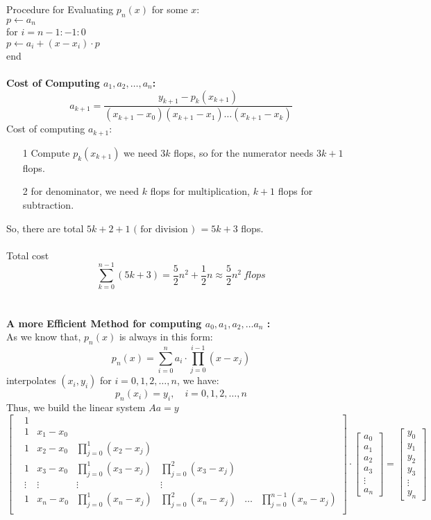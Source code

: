 \documentclass [9 pt]{article}
\theoremstyle{definition}
\begin{document}
Procedure for Evaluating $p_n(x)$ for some $x$:\\
$p \gets a_n$\\
for $i = n - 1 : -1 : 0$\\
$p \gets a_i + (x - x_i) \cdot p$\\
end\\
\\
\textbf{Cost of Computing $a_1, a_2, \ldots , a_n$:}
$$ a_{k+1} = \dfrac{y_{k+1} - p_{k}(x_{k+1})}{ (x_{k+1} - x_0)(x_{k+1} - x_1) \ldots (x_{k+1} - x_k) } $$
Cost of computing $a_{k+1}$:
\begin{itemize}
	\item[1] Compute $p_{k}(x_{k+1})$ we need $3k$ flops, so for the numerator needs $3k+1$ flops.
	\item[2] for denominator, we need $k$ flops for multiplication, $k+1$ flops for subtraction.  
\end{itemize}
So, there are total $5k+2 + 1  \text{ ( for division ) } = 5k+3$ flops.\\
\\
Total cost 
$$ \sum_{k = 0}^{n - 1} (5k + 3) = \dfrac{5}{2}n^2 + \dfrac{1}{2} n \approx \dfrac{5}{2} n^2 \ flops $$\\
\\
\textbf{A more Efficient Method for computing $a_0, a_1, a_2, \ldots a_n$ : }\\
As we know that, $p_n(x)$ is always in this form: 
$$ p_n(x) = \sum_{i = 0}^{n} a_i \cdot \prod_{j = 0}^{i - 1} (x - x_j) $$
interpolates $(x_i, y_i) $ for $i = 0, 1, 2, \ldots , n$, we have:
$$p_n(x_i) = y_i, \quad i = 0, 1, 2, \ldots , n$$
Thus, we build the linear system $Aa = y$
$$ 
\begin{bmatrix}
	&1 \\
	&1 & x_1 - x_0 \\
	&1 & x_2 - x_0 & \prod_{j = 0}^1(x_2 - x_j) \\
	&1 & x_3 - x_0 & \prod_{j = 0}^1(x_3 - x_j) & \prod_{j = 0}^2(x_3 - x_j)  \\
	&\vdots &\vdots & \vdots &\vdots\\
	&1 & x_n - x_0 & \prod_{j = 0}^1(x_n - x_j) & \prod_{j = 0}^2(x_n - x_j) &\ldots & \prod_{j = 0}^{n-1}(x_n - x_j)    \\
\end{bmatrix} \cdot \begin{bmatrix}
	a_0\\
	a_1\\
	a_2\\
	a_3\\
	\vdots\\
	a_n
\end{bmatrix}
 = 
 \begin{bmatrix}
	y_0\\
	y_1\\
	y_2\\
	y_3\\
	\vdots\\
	y_n
\end{bmatrix} $$
\end{document}
